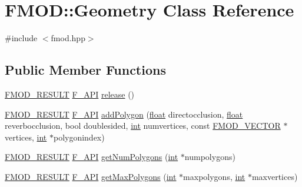 \hypertarget{class_f_m_o_d_1_1_geometry}{\section{F\-M\-O\-D\-:\-:Geometry Class Reference}
\label{class_f_m_o_d_1_1_geometry}
}


{\ttfamily \#include $<$fmod.\-hpp$>$}

\subsection*{Public Member Functions}
\begin{DoxyCompactItemize}
\item 
\hyperlink{fmod_8h_ae6ddadf8cb315e93ae7e6456b19db276}{F\-M\-O\-D\-\_\-\-R\-E\-S\-U\-L\-T} \hyperlink{fmod_8h_ace803d13e798b0cdde4384f9f323b901}{F\-\_\-\-A\-P\-I} \hyperlink{class_f_m_o_d_1_1_geometry_ad984475b495e44b9c0ed0b2b1377c65c}{release} ()
\item 
\hyperlink{fmod_8h_ae6ddadf8cb315e93ae7e6456b19db276}{F\-M\-O\-D\-\_\-\-R\-E\-S\-U\-L\-T} \hyperlink{fmod_8h_ace803d13e798b0cdde4384f9f323b901}{F\-\_\-\-A\-P\-I} \hyperlink{class_f_m_o_d_1_1_geometry_ad136a5cbb2de501723a3cbdee0165998}{add\-Polygon} (\hyperlink{fmod_8h_aeb841aa4b4b5f444b5d739d865b420af}{float} directocclusion, \hyperlink{fmod_8h_aeb841aa4b4b5f444b5d739d865b420af}{float} reverbocclusion, bool doublesided, \hyperlink{wglew_8h_a500a82aecba06f4550f6849b8099ca21}{int} numvertices, const \hyperlink{struct_f_m_o_d___v_e_c_t_o_r}{F\-M\-O\-D\-\_\-\-V\-E\-C\-T\-O\-R} $\ast$vertices, \hyperlink{wglew_8h_a500a82aecba06f4550f6849b8099ca21}{int} $\ast$polygonindex)
\item 
\hyperlink{fmod_8h_ae6ddadf8cb315e93ae7e6456b19db276}{F\-M\-O\-D\-\_\-\-R\-E\-S\-U\-L\-T} \hyperlink{fmod_8h_ace803d13e798b0cdde4384f9f323b901}{F\-\_\-\-A\-P\-I} \hyperlink{class_f_m_o_d_1_1_geometry_aa827d0503715f5bf09680660c4d3b841}{get\-Num\-Polygons} (\hyperlink{wglew_8h_a500a82aecba06f4550f6849b8099ca21}{int} $\ast$numpolygons)
\item 
\hyperlink{fmod_8h_ae6ddadf8cb315e93ae7e6456b19db276}{F\-M\-O\-D\-\_\-\-R\-E\-S\-U\-L\-T} \hyperlink{fmod_8h_ace803d13e798b0cdde4384f9f323b901}{F\-\_\-\-A\-P\-I} \hyperlink{class_f_m_o_d_1_1_geometry_af735ddc6409a2f3df7309775921f1557}{get\-Max\-Polygons} (\hyperlink{wglew_8h_a500a82aecba06f4550f6849b8099ca21}{int} $\ast$maxpolygons, \hyperlink{wglew_8h_a500a82aecba06f4550f6849b8099ca21}{int} $\ast$maxvertices)
\item 

\end{DoxyCompactItemize}
